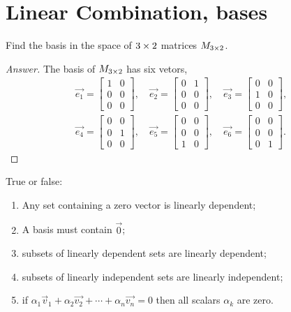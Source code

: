 \section{Linear Combination, bases}
\begin{exercise}
  Find the basis in the space of $3\times 2$ matrices
  $M_{3\times 2}$.
\end{exercise}
\begin{proof}[Answer]
  The basis of $M_{3\times 2}$ has six vetors,
  \begin{align*}
    \vec{e_1}=\begin{bmatrix} 1&0\\0&0\\0&0 \end{bmatrix},\quad
    \vec{e_2}=\begin{bmatrix} 0&1\\0&0\\0&0 \end{bmatrix},\quad
    \vec{e_3}=\begin{bmatrix} 0&0\\1&0\\0&0 \end{bmatrix},\\[0.3cm]
    \vec{e_4}=\begin{bmatrix} 0&0\\0&1\\0&0 \end{bmatrix},\quad
    \vec{e_5}=\begin{bmatrix} 0&0\\0&0\\1&0 \end{bmatrix},\quad
    \vec{e_6}=\begin{bmatrix} 0&0\\0&0\\0&1 \end{bmatrix}.
  \end{align*}
\end{proof}
\begin{exercise}
  True or false:
  \begin{enumerate}[label={\alph*)}]
    \item Any set containing a zero vector is linearly dependent;
    \item A basis must contain $\vec{0}$;
    \item subsets of linearly dependent sets are linearly dependent;
    \item subsets of linearly independent sets are linearly independent;
    \item if $\alpha_1\vec{v}_1+\alpha_2\vec{v_2}+\cdots+\alpha_n\vec{v_n}=0$
      then all scalars $\alpha_k$ are zero.
  \end{enumerate}
\end{exercise}
